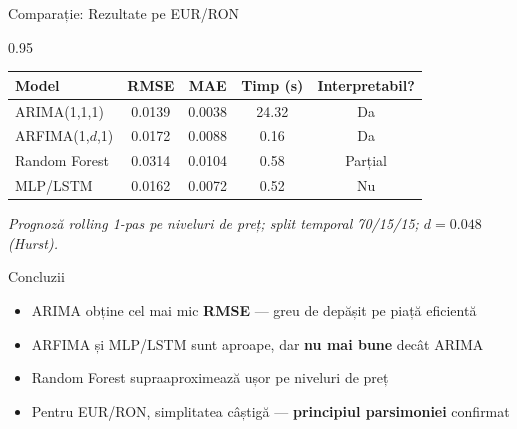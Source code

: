 \documentclass[9pt, aspectratio=169, t]{beamer}
\begin{document}
\begin{frame}{Comparație: Rezultate pe EUR/RON}
    \begin{cminipage}{0.95\textwidth}
        \begin{center}
            {\small
            \begin{tabular}{l|c|c|c|c}
                \toprule
                \textbf{Model} & \textbf{RMSE} & \textbf{MAE} & \textbf{Timp (s)} & \textbf{Interpretabil?} \\
                \midrule
                ARIMA(1,1,1) & 0.0139 & 0.0038 & 24.32 & Da \\
                ARFIMA(1,$d$,1) & 0.0172 & 0.0088 & 0.16 & Da \\
                Random Forest & 0.0314 & 0.0104 & 0.58 & Parțial \\
                MLP/LSTM & 0.0162 & 0.0072 & 0.52 & Nu \\
                \bottomrule
            \end{tabular}
            }
        \end{center}
        {\scriptsize \textit{Prognoză rolling 1-pas pe niveluri de preț; split temporal 70/15/15; $d = 0.048$ (Hurst).}}

        \vspace{0.1cm}

        \begin{alertblock}{Concluzii}
            \begin{itemize}\setlength{\itemsep}{0pt}
                \item ARIMA obține cel mai mic \textbf{RMSE} --- greu de depășit pe piață eficientă
                \item ARFIMA și MLP/LSTM sunt aproape, dar \textbf{nu mai bune} decât ARIMA
                \item Random Forest supraaproximează ușor pe niveluri de preț
                \item Pentru EUR/RON, simplitatea câștigă --- \textbf{principiul parsimoniei} confirmat
            \end{itemize}
        \end{alertblock}
    \end{cminipage}
\end{frame}
\end{document}
